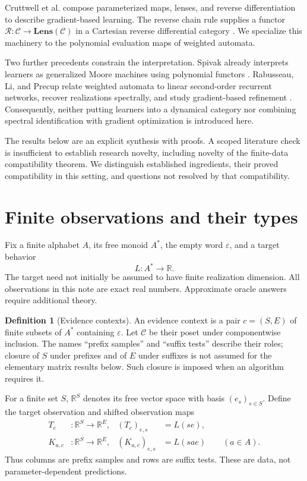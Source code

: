 \documentclass[11pt]{article}
\theoremstyle{definition}
\newtheorem{definition}[theorem]{Definition}
\newcommand{\R}{\mathbb R}
\newcommand{\Lens}{\mathbf{Lens}}
\newcommand{\rev}{\mathcal R}
\begin{document}
Cruttwell et al. compose parameterized maps, lenses, and reverse differentiation
to describe gradient-based learning. The reverse chain rule supplies a functor
$\rev:\mathcal C\to\Lens(\mathcal C)$ in a Cartesian reverse differential
category \cite{gradient}. We specialize this machinery to the polynomial
evaluation maps of weighted automata.

Two further precedents constrain the interpretation. Spivak already interprets
learners as generalized Moore machines using polynomial functors
\cite{spivak}. Rabusseau, Li, and Precup relate weighted automata to linear
second-order recurrent networks, recover realizations spectrally, and study
gradient-based refinement \cite{rabusseau}. Consequently, neither putting
learners into a dynamical category nor combining spectral identification with
gradient optimization is introduced here.

The results below are an explicit synthesis with proofs. A scoped literature
check is insufficient to establish research novelty, including novelty of the
finite-data compatibility theorem. We distinguish established ingredients,
their proved compatibility in this setting, and questions not resolved by that
compatibility.

\section{Finite observations and their types}

Fix a finite alphabet $A$, its free monoid $A^*$, the empty word $\varepsilon$,
and a target behavior
\[
L:A^*\longrightarrow\R.
\]
The target need not initially be assumed to have finite realization dimension.
All observations in this note are exact real numbers. Approximate oracle
answers require additional theory.

\begin{definition}[Evidence contexts]
An evidence context is a pair $c=(S,E)$ of finite subsets of $A^*$ containing
$\varepsilon$. Let $\mathcal C$ be their poset under componentwise inclusion.
The names ``prefix samples'' and ``suffix tests'' describe their roles; closure
of $S$ under prefixes and of $E$ under suffixes is not assumed for the elementary
matrix results below. Such closure is imposed when an algorithm requires it.
\end{definition}

For a finite set $S$, $\R^S$ denotes its free vector space with basis
$(e_s)_{s\in S}$. Define the target observation and shifted observation maps
\begin{align}
T_c &: \R^S\longrightarrow\R^E,
& (T_c)_{e,s}&=L(se),\label{eq:target}\\
K_{a,c} &: \R^S\longrightarrow\R^E,
& (K_{a,c})_{e,s}&=L(sae)\qquad(a\in A).
\end{align}
Thus columns are prefix samples and rows are suffix tests. These are data,
not parameter-dependent predictions.
\end{document}

